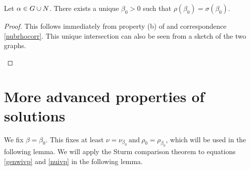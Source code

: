 \begin{lemma}\label{genlem5}
Let $\alpha\in G\cup N$. There exists a unique $\beta_0 > 0$ such that $\rho \left(
\beta_0 \right) = \sigma \left( \beta_0 \right)$.
\end{lemma}
\begin{proof}
This follows immediately from property (b) of  and correspondence
\eqref{nubrhocorr}.
This unique intersection can also be seen from a sketch of the two graphs.
\hfill\\

\begin{centering}
\end{centering} 
\end{proof}

\section{More advanced properties of solutions}
We fix $\beta = \beta_0$. This fixes at least $\nu = \nu_{\beta_0} ~ \text{and}
~ \rho_0 = \rho_{\beta_0}$, which will be used in the following lemma.   
We will apply the Sturm comparison theorem to equations \eqref{genwivp} and 
\eqref{nuivp} in the following lemma.

